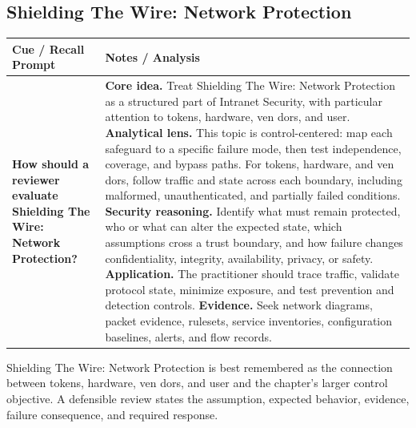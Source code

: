 \documentclass[11pt]{article}
\newcommand{\CornellHeader}{%
\rowcolor{Navy}\color{white}\bfseries Cue / Recall Prompt & \color{white}\bfseries Notes / Analysis\\\hline}
\newcommand{\CornellRow}[2]{%
\cellcolor{CueGray}\RaggedRight\textbf{#1} & \RaggedRight #2\\\hline}
\begin{document}
\subsection*{Shielding The Wire: Network Protection}
\begin{longtable}{>{\RaggedRight\arraybackslash}p{}|>{\RaggedRight\arraybackslash}p{}}
\CornellHeader
\CornellRow{How should a reviewer evaluate Shielding The Wire: Network Protection?}{\textbf{Core idea.} Treat Shielding The Wire: Network Protection as a structured part of Intranet Security, with particular attention to tokens, hardware, ven dors, and user. \textbf{Analytical lens.} This topic is control-centered: map each safeguard to a specific failure mode, then test independence, coverage, and bypass paths. For tokens, hardware, and ven dors, follow traffic and state across each boundary, including malformed, unauthenticated, and partially failed conditions. \textbf{Security reasoning.} Identify what must remain protected, who or what can alter the expected state, which assumptions cross a trust boundary, and how failure changes confidentiality, integrity, availability, privacy, or safety. \textbf{Application.} The practitioner should trace traffic, validate protocol state, minimize exposure, and test prevention and detection controls. \textbf{Evidence.} Seek network diagrams, packet evidence, rulesets, service inventories, configuration baselines, alerts, and flow records.}
\end{longtable}
\begin{topicsummary}
Shielding The Wire: Network Protection is best remembered as the connection between tokens, hardware, ven dors, and user and the chapter's larger control objective. A defensible review states the assumption, expected behavior, evidence, failure consequence, and required response.
\end{topicsummary}
\end{document}
